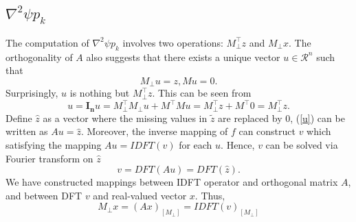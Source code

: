 \documentclass{article}
\begin{document}
\subsection{$\nabla^2\psi p_k$}
The computation of $\nabla^2\psi p_k$ involves two operations: $M_{\perp}^\top z$ and $M_{\perp}x$. The orthogonality of $A$ also suggests that there exists a unique vector $u\in \mathcal{R}^{n}$ such that
\begin{equation}\label{u}
    M_{\perp}u = z, Mu = 0.
\end{equation}
Surprisingly, $u$ is nothing but $M_{\perp}^{\top}z$. This can be seen from
\begin{equation}
    u = \mathbf{I_n}u = M_{\perp}^{\top} M_{\perp}u +  M^{\top}Mu = M_{\perp}^{\top}z + M^{\top}0 = M_{\perp}^{\top}z.
\end{equation}
Define $\widehat{z}$ as a vector where the missing values in $\widetilde{z}$ are replaced by 0, (\ref{u}) can be written as $Au = \widehat{z}$. Moreover, the inverse mapping of $f$ can construct $v$ which satisfying the mapping $Au = IDFT(v)$ for each $u$. Hence, $v$ can be solved via Fourier transform on $\widehat{z}$
\begin{equation}
    v = DFT(Au) = DFT(\widehat{z}).
\end{equation}
We have constructed mappings between IDFT operator and orthogonal matrix $A$, and between DFT $v$ and real-valued vector $x$. Thus,
\begin{equation}
    M_{\perp}x = \left(Ax\right)_{[M_{\perp}]} = IDFT\left(v\right)_{[M_{\perp}]}
\end{equation}
\end{document}
